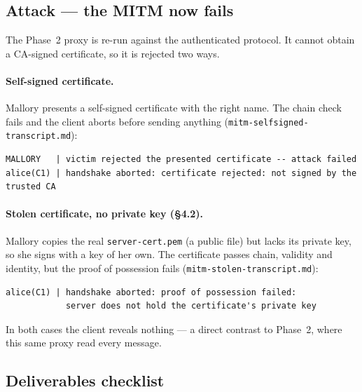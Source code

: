 \documentclass[11pt,a4paper]{article}
\begin{document}
\subsection{Attack --- the MITM now fails}

The Phase~2 proxy is re-run against the authenticated protocol. It cannot obtain a CA-signed
certificate, so it is rejected two ways.

\paragraph{Self-signed certificate.} Mallory presents a self-signed certificate with the right name.
The chain check fails and the client aborts before sending anything
(\texttt{mitm-selfsigned-transcript.md}):

\begin{lstlisting}
MALLORY   | victim rejected the presented certificate -- attack failed
alice(C1) | handshake aborted: certificate rejected: not signed by the trusted CA
\end{lstlisting}

\paragraph{Stolen certificate, no private key (\S4.2).} Mallory copies the real \texttt{server-cert.pem}
(a public file) but lacks its private key, so she signs with a key of her own. The certificate passes
chain, validity and identity, but the proof of possession fails
(\texttt{mitm-stolen-transcript.md}):

\begin{lstlisting}
alice(C1) | handshake aborted: proof of possession failed:
            server does not hold the certificate's private key
\end{lstlisting}

In both cases the client reveals nothing --- a direct contrast to Phase~2, where this same proxy read
every message.

\subsection{Deliverables checklist}
\end{document}
